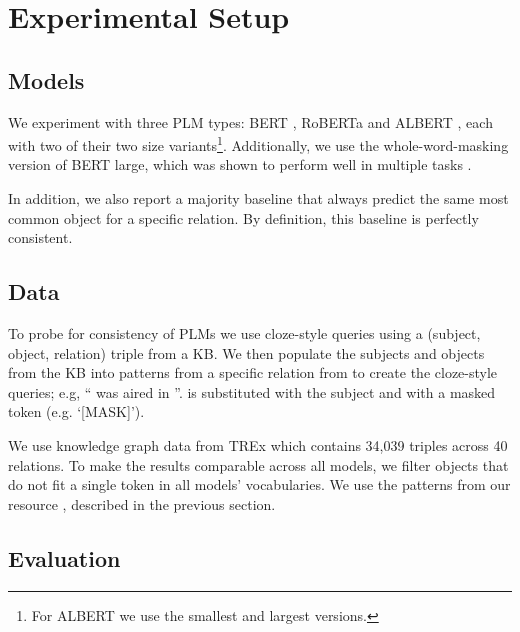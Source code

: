 \section{Experimental Setup}
\label{sec:setup}

\subsection{Models}
We experiment with three PLM types: BERT \cite{bert}, RoBERTa \cite{roberta} and ALBERT \cite{albert}, each with two of their two size variants\footnote{For ALBERT we use the smallest and largest versions.}. Additionally, we use the whole-word-masking version of BERT large, which was shown to perform well in multiple tasks \cite{talmor2019olmpics}.

In addition, we also report a majority baseline that always predict the same most common object for a specific relation. By definition, this baseline is perfectly consistent.

\subsection{Data}

To probe for consistency of PLMs we use cloze-style queries using a (subject, object, relation) triple from a KB. We then populate the subjects and objects from the KB into patterns from a specific relation from \resource{} to create the cloze-style queries; e.g, ``\subj{} was aired in \obj{}''. \subj{} is substituted with the subject and \obj{} with a masked token (e.g. `[MASK]').

We use knowledge graph data from TREx \cite{trex} which contains 34,039 triples across 40 relations. To make the results comparable across all models, we filter objects that do not fit a single token in all models' vocabularies.
We use the patterns from our resource \resource{}, described in the previous section.


\subsection{Evaluation}
\label{sec:eval}



